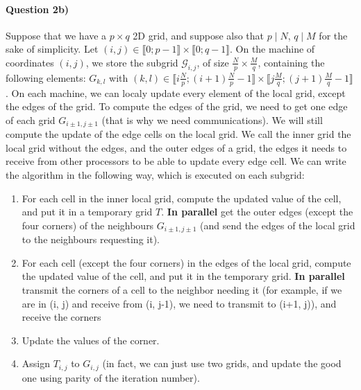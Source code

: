 \documentclass[a4paper,12pt]{article}
\begin{document}
\paragraph{Question 2b)} Suppose that we have a $p \times q$ 2D grid, and suppose also that $p \mid N$, $q \mid M$ for the sake of simplicity. Let $(i, j) \in \llbracket 0; p-1 \rrbracket \times \llbracket 0; q - 1 \rrbracket$. On the machine of coordinates $(i, j)$, we store the subgrid $\mathcal{G}_{i,j}$, of size $\frac{N}{p} \times \frac{M}{q}$, containing the following elements: $G_{k, l}$ with $(k, l) \in \llbracket i\frac{N}{p}; (i+1)\frac{N}{p}-1 \rrbracket \times \llbracket j\frac{M}{q}; (j+1)\frac{M}{q}-1 \rrbracket$. On each machine, we can localy update every element of the local grid, except the edges of the grid. To compute the edges of the grid, we need to get one edge of each grid $G_{i\pm1, j\pm1}$ (that is why we need communications). We will still compute the update of the edge cells on the local grid. We call the inner grid the local grid without the edges, and the outer edges of a grid, the edges it needs to receive from other processors to be able to update every edge cell. We can write the algorithm in the following way, which is executed on each subgrid:
\begin{enumerate}
\item For each cell in the inner local grid, compute the updated value of the cell, and put it in a temporary grid $T$. \textbf{In parallel} get the outer edges (except the four corners) of the neighbours $G_{i\pm1, j\pm1}$ (and send the edges of the local grid to the neighbours requesting it). 
\item For each cell (except the four corners) in the edges of the local grid, compute the updated value of the cell, and put it in the temporary grid. \textbf{In parallel} transmit the corners of a cell to the neighbor needing it (for example, if we are in (i, j) and receive from (i, j-1), we need to transmit to (i+1, j)), and receive the corners
\item Update the values of the corner.
\item Assign $T_{i,j}$ to $G_{i,j}$ (in fact, we can just use two grids, and update the good one using parity of the iteration number).
\end{enumerate}
\end{document}
